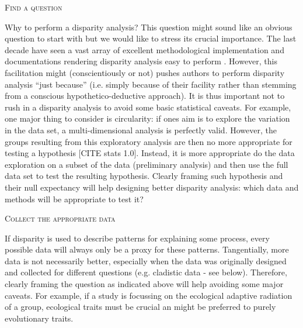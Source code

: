 \documentclass[12pt,letterpaper]{article}
\renewcommand{\section}[1]{%
\bigskip
\begin{center}
\begin{Large}
\normalfont\scshape #1
\medskip
\end{Large}
\end{center}}
\begin{document}
\section{Find a question}
Why to perform a disparity analysis?
This question might sound like an obvious question to start with but we would like to stress its crucial importance.
The last decade have seen a vast array of excellent methodological implementation and documentations rendering disparity analysis easy to perform \citep{bouxin2005ginkgo,oksanen2007vegan,geiger2008,zelditch2012geometric,adams2013geomorph,Claddis,dispRityv02,adams2017geometric}.
However, this facilitation might (conscientiously or not) pushes authors to perform disparity analysis ``just because'' (i.e. simply because of their facility rather than stemming from a conscious hypothetico-deductive approach).
It is thus important not to rush in a disparity analysis to avoid some basic statistical caveats.
For example, one major thing to consider is circularity: if ones aim is to explore the variation in the data set, a multi-dimensional analysis is perfectly valid.
However, the groups resulting from this exploratory analysis are then no more appropriate for testing a hypothesis [CITE stats 1.0].
Instead, it is more appropriate do the data exploration on a subset of the data (preliminary analysis) and then use the full data set to test the resulting hypothesis.
Clearly framing such hypothesis and their null expectancy will help designing better disparity analysis: which data and methods will be appropriate to test it?

\section{Collect the appropriate data}
If disparity is used to describe patterns for explaining some process, every possible data will always only be a proxy for these patterns.
Tangentially, more data is not necessarily better, especially when the data was originally designed and collected for different questions (e.g. cladistic data - see below).
Therefore, clearly framing the question as indicated above will help avoiding some major caveats.
For example, if a study is focussing on the ecological adaptive radiation of a group, ecological traits must be crucial an might be preferred to purely evolutionary traits.
\end{document}
